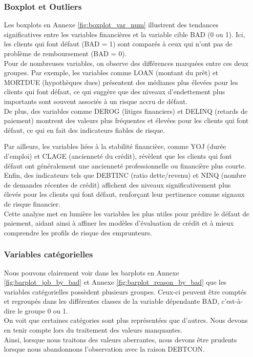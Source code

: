 \documentclass[a4paper,12pt]{report}
\begin{document}
\subsubsection{Boxplot et Outliers}

Les boxplots en Annexe \ref{fig:boxplot_var_num} illustrent des tendances significatives entre les variables financières et la variable cible BAD (0 ou 1). Ici, les clients qui font défaut (BAD = 1) sont comparés à ceux qui n’ont pas de problème de remboursement (BAD = 0).\\
Pour de nombreuses variables, on observe des différences marquées entre ces deux groupes.
Par exemple, les variables comme LOAN (montant du prêt) et MORTDUE (hypothèques dues) présentent des médianes plus élevées pour les clients qui font défaut, ce qui suggère que des niveaux d'endettement plus importants sont souvent associés à un risque accru de défaut.\\
De plus, des variables comme DEROG (litiges financiers) et DELINQ (retards de paiement) montrent des valeurs plus fréquentes et élevées pour les clients qui font défaut, ce qui en fait des indicateurs fiables de risque.

\bigbreak

Par ailleurs, les variables liées à la stabilité financière, comme YOJ (durée d’emploi) et CLAGE (ancienneté du crédit), révèlent que les clients qui font défaut ont généralement une ancienneté professionnelle ou financière plus courte.\\
Enfin, des indicateurs tels que DEBTINC (ratio dette/revenu) et NINQ (nombre de demandes récentes de crédit) affichent des niveaux significativement plus élevés pour les clients qui font défaut, renforçant leur pertinence comme signaux de risque financier.\\
Cette analyse met en lumière les variables les plus utiles pour prédire le défaut de paiement, aidant ainsi à affiner les modèles d’évaluation de crédit et à mieux comprendre les profils de risque des emprunteurs.

\pagebreak

\subsubsection{Variables catégorielles}

Nous pouvons clairement voir dans les barplots en Annexe \ref{fig:barplot_job_by_bad} et Annexe \ref{fig:barplot_reason_by_bad} que les variables catégorielles
possèdent plusieurs groupes. Ceux-ci peuvent être comptés et regroupés dans les différentes classes de la variable dépendante BAD, c'est-à-dire le groupe 0 ou 1.\\
On voit que certaines catégories sont plus représentées que d'autres. Nous devons en tenir compte lors du traitement des valeurs manquantes.\\
Ainsi, lorsque nous traitons des valeurs aberrantes, nous devons être prudents lorsque nous abandonnons l'observation avec la raison DEBTCON.
\end{document}
